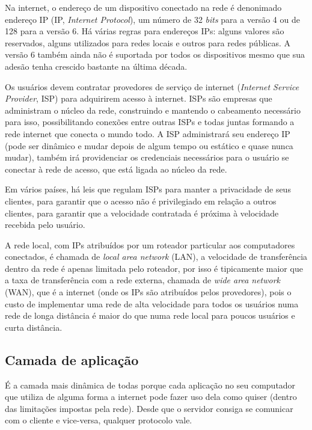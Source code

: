 \documentclass[brazilian,a4paper,twocolumn]{article}
\begin{document}
Na internet, o endereço de um dispositivo conectado na rede é denonimado endereço IP (IP, \textit{Internet Protocol}), um número de 32 \textit{bits} para a versão 4 ou de 128 para a versão 6. Há várias regras para endereços IPs: alguns valores são reservados, alguns utilizados para redes locais e outros para redes públicas. A versão 6 também ainda não é suportada por todos os dispositivos mesmo que sua adesão tenha crescido bastante na última década.

Os usuários devem contratar provedores de serviço de internet (\textit{Internet Service Provider}, ISP) para adquirirem acesso à internet. ISPs são empresas que administram o núcleo da rede, construindo e mantendo o cabeamento necessário para isso, possibilitando conexões entre outras ISPs e todas juntas formando a rede internet que conecta o mundo todo. A ISP administrará seu endereço IP (pode ser dinâmico e mudar depois de algum tempo ou estático e quase nunca mudar), também irá providenciar os credenciais necessários para o usuário se conectar à rede de acesso, que está ligada ao núcleo da rede.

Em vários países, há leis que regulam ISPs para manter a privacidade de seus clientes, para garantir que o acesso não é privilegiado em relação a outros clientes, para garantir que a velocidade contratada é próxima à velocidade recebida pelo usuário.

A rede local, com IPs atribuídos por um roteador particular aos computadores conectados, é chamada de \textit{local area network} (LAN), a velocidade de transferência dentro da rede é apenas limitada pelo roteador, por isso é tipicamente maior que a taxa de transferência com a rede externa, chamada de \textit{wide area network} (WAN), que é a internet (onde os IPs são atribuídos pelos provedores), pois o custo de implementar uma rede de alta velocidade para todos os usuários numa rede de longa distância é maior do que numa rede local para poucos usuários e curta distância.


\subsection{Camada de aplicação}

É a camada mais dinâmica de todas porque cada aplicação no seu computador que utiliza de alguma forma a internet pode fazer uso dela como quiser (dentro das limitações impostas pela rede). Desde que o servidor consiga se comunicar com o cliente e vice-versa, qualquer protocolo vale.
\end{document}
